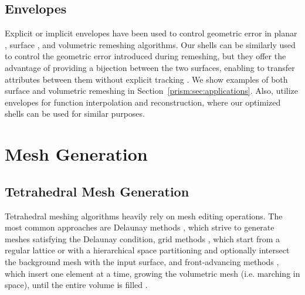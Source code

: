 \subsection{Envelopes}
Explicit \cite{cohen1996simplification,cohen1997simplifying} or implicit \cite{hu2016error} envelopes have been used to control geometric error in planar \cite{hu2019triwild}, surface {\cite{gueziec1996surface,hu2017, Cheng2019}}, and volumetric \cite{hu2018tetrahedral,Hu:2019:fTetWild} remeshing algorithms. Our shells can be similarly used to control the geometric error introduced during remeshing, but they offer the advantage of providing a bijection between the two surfaces, enabling to transfer attributes between them without explicit tracking \cite{cohen1997simplifying}. We show examples of both surface and volumetric remeshing in Section~\ref{prism:sec:applications}.
{Also, \cite{barnhill_opitz_pottmann_1992,bajaj2002hierarchical} utilize envelopes for function interpolation and reconstruction, 
where our optimized shells can be used for similar purposes.}


\section{Mesh Generation}\label{cumin:sec:related}


\subsection{Tetrahedral Mesh Generation}

Tetrahedral meshing algorithms heavily rely on mesh editing operations. The most common approaches are Delaunay methods \cite{shewchuk1998tetrahedral,ruppert1995delaunay,Remacle:2017:ATL,du2003tetrahedral,alliez2005variational,tournois2009interleaving,murphy2001point,CohenSteiner:2002:CDT,chew1989constrained,si2005meshing,shewchuk2002constrained,Si:2014:ICA,cheng2008practical,boissonnat2005provably,jamin2015cgalmesh,Dey:2008:DAD,Chen:2004:ODT,Shewchuk:1996,Cheng:2012:DMG,Bishop2016,Busaryev:RMI:2009,triangulation_in_cgal,tetgen}, which strive to generate meshes satisfying the Delaunay condition, grid methods \cite{Yerry1983,BERN1994,Molino:2003:TMG,Bronson:2013:LCC,Labelle:2007:ISF,Doran:2013:ISI,code:quartet}, which start from a regular lattice or with a hierarchical space partitioning and optionally intersect the background mesh with the input surface, and front-advancing methods \cite{Sadek1980,Cuilliere:2013:ADM,Alauzet:2014:ACA,Haimes:2014:MMO}, which insert one element at a time, growing the volumetric mesh (i.e. marching in space), until the entire volume is filled .

